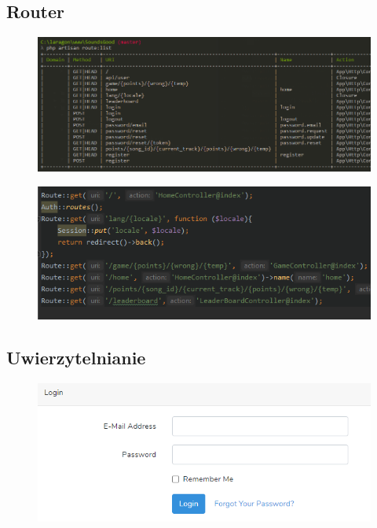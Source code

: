 \documentclass[11pt,a4paper]{article}
\begin{document}
\subsection{\textbf{Router}}
\begin{figure} [h]
\centering
\includegraphics [keepaspectratio, scale=0.7] {1.5.png}
\end{figure}
\begin{figure} [h]
\centering
\includegraphics [scale=1] {1.5.1.png}
\end{figure}
\newpage
\subsection{\textbf{Uwierzytelnianie}}
\begin{figure} [h]
\centering
\includegraphics [keepaspectratio] {1.6.png}
\end{figure}
\newpage
\end{document}
